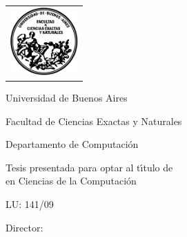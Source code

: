 \newcommand{\HRule}{\rule{\linewidth}{0.2mm}}
%
\thispagestyle{empty}

\begin{center}\leavevmode

\vspace{-2cm}

\begin{tabular}{l}
\includegraphics[width=2.6cm]{logofcen.pdf}
\end{tabular}


{\large \sc Universidad de Buenos Aires

Facultad de Ciencias Exactas y Naturales

Departamento de Computaci\'on}

\vspace{6.0cm}


{\huge\bf \tituloTesis}

\vspace{2cm}

{\large Tesis presentada para optar al t\'{\i}tulo de\\
\titulo en Ciencias de la Computaci\'on}

\vspace{2cm}

{\Large \autor}

{LU: 141/09}

\end{center}

\vfill

{\large

{Director: \director}

\vspace{.2cm}


\lugar
}

\newpage\thispagestyle{empty}
